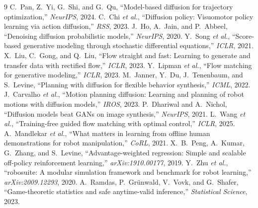 \documentclass[letterpaper, 10 pt, conference]{ieeeconf}
\begin{document}
\clearpage
{\footnotesize
\renewcommand{\baselinestretch}{0.95}\selectfont
\begin{thebibliography}{9}\itemsep -1pt
 C.\ Pan, Z.\ Yi, G.\ Shi, and G.\ Qu, ``Model-based diffusion for trajectory optimization,'' \textit{NeurIPS}, 2024.
 C.\ Chi \textit{et al.}, ``Diffusion policy: Visuomotor policy learning via action diffusion,'' \textit{RSS}, 2023.
 J.\ Ho, A.\ Jain, and P.\ Abbeel, ``Denoising diffusion probabilistic models,'' \textit{NeurIPS}, 2020.
 Y.\ Song \textit{et al.}, ``Score-based generative modeling through stochastic differential equations,'' \textit{ICLR}, 2021.
 X.\ Liu, C.\ Gong, and Q.\ Liu, ``Flow straight and fast: Learning to generate and transfer data with rectified flow,'' \textit{ICLR}, 2023.
 Y.\ Lipman \textit{et al.}, ``Flow matching for generative modeling,'' \textit{ICLR}, 2023.
 M.\ Janner, Y.\ Du, J.\ Tenenbaum, and S.\ Levine, ``Planning with diffusion for flexible behavior synthesis,'' \textit{ICML}, 2022.
 J.\ Carvalho \textit{et al.}, ``Motion planning diffusion: Learning and planning of robot motions with diffusion models,'' \textit{IROS}, 2023.
 P.\ Dhariwal and A.\ Nichol, ``Diffusion models beat GANs on image synthesis,'' \textit{NeurIPS}, 2021.
 L.\ Wang \textit{et al.}, ``Training-free guided flow matching with optimal control,'' \textit{ICLR}, 2025.
 A.\ Mandlekar \textit{et al.}, ``What matters in learning from offline human demonstrations for robot manipulation,'' \textit{CoRL}, 2021.
 X.\ B.\ Peng, A.\ Kumar, G.\ Zhang, and S.\ Levine, ``Advantage-weighted regression: Simple and scalable off-policy reinforcement learning,'' \textit{arXiv:1910.00177}, 2019.
 Y.\ Zhu \textit{et al.}, ``robosuite: A modular simulation framework and benchmark for robot learning,'' \textit{arXiv:2009.12293}, 2020.
 A.\ Ramdas, P.\ Gr\"unwald, V.\ Vovk, and G.\ Shafer, ``Game-theoretic statistics and safe anytime-valid inference,'' \textit{Statistical Science}, 2023.
\end{thebibliography}}
\end{document}
